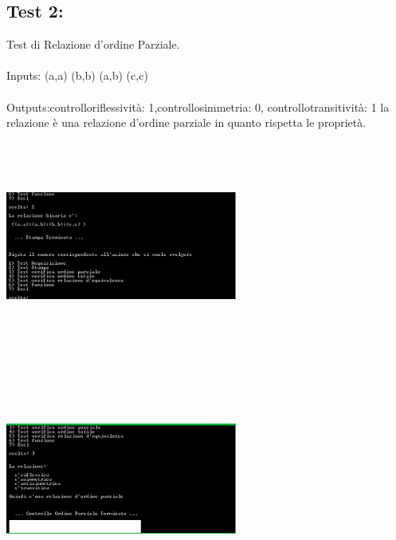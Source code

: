 \documentclass[11pt, a4paper, titlepage, block]{article}
\begin{document}
	\subsection{Test 2:}
	Test di Relazione d'ordine Parziale.\\
	\\
	Inputs: (a,a) (b,b) (a,b) (c,c) \\
	\\
	Outputs:controlloriflessivit\`a: 1,controllosimmetria: 0, controllotransitivit\`a: 1
	la relazione \`e una relazione d'ordine parziale in quanto rispetta le propriet\`a.\\
	\includegraphics[width=3in,height=3in,viewport=0 0 300 300]{../Screenshots/Test2Input.png}
	\\
	\includegraphics[width=3in,height=3in,viewport=0 0 300 300]{../Screenshots/Test2Output.png}
	\\
	\\
	\newpage
\end{document}
